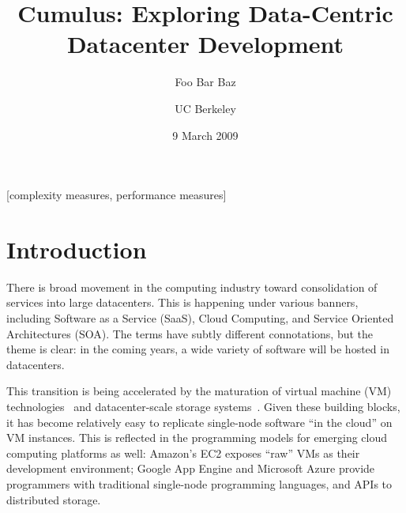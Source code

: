 \documentclass{sig-alternate}
\begin{document}

\newcommand{\BOOM} {Cumulus}
\newcommand{\JOL} {LogJam}

\title{\BOOM: Exploring Data-Centric Datacenter Development}
\author{
\alignauthor
Foo
\alignauthor
Bar
\alignauthor
Baz
\and
UC Berkeley
}
\date{9 March 2009}

\maketitle
\begin{abstract}
\end{abstract}

[complexity measures, performance measures]


\section{Introduction}
There is broad movement in the computing industry toward consolidation of  services into large datacenters.  This is happening under various banners, including Software as a Service (SaaS), Cloud Computing, and Service Oriented Architectures (SOA).  The terms have subtly different connotations, but the theme is clear: in the coming years, a wide variety of software will be hosted in datacenters.

This transition is being accelerated by the maturation of virtual machine (VM) technologies~\cite{vmsurvey} and datacenter-scale storage systems~\cite{GFS,S3,SSDS}.  Given these building blocks, it has become relatively easy to replicate single-node software ``in the cloud'' on VM instances.  This is reflected in the programming models for emerging cloud computing platforms as well: Amazon's EC2 exposes ``raw'' VMs as their development environment; Google App Engine and Microsoft Azure provide programmers with traditional single-node programming languages, and APIs to distributed storage.
\end{document}
